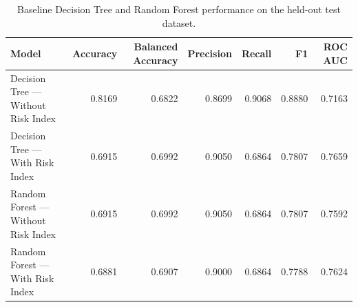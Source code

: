 \begin{table}[htbp]
\caption{Baseline Decision Tree and Random Forest performance on the held-out test dataset.}
\label{tab:baseline_tree_models}
\begin{tabular}{lrrrrrr}
\toprule
Model & Accuracy & Balanced Accuracy & Precision & Recall & F1 & ROC AUC \\
\midrule
Decision Tree — Without Risk Index & 0.8169 & 0.6822 & 0.8699 & 0.9068 & 0.8880 & 0.7163 \\
Decision Tree — With Risk Index & 0.6915 & 0.6992 & 0.9050 & 0.6864 & 0.7807 & 0.7659 \\
Random Forest — Without Risk Index & 0.6915 & 0.6992 & 0.9050 & 0.6864 & 0.7807 & 0.7592 \\
Random Forest — With Risk Index & 0.6881 & 0.6907 & 0.9000 & 0.6864 & 0.7788 & 0.7624 \\
\bottomrule
\end{tabular}
\end{table}
